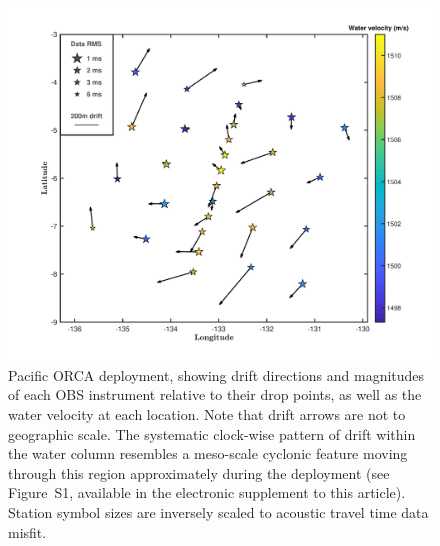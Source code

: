 \documentclass[10pt,titlepage]{article}
\begin{document}
\newpage

\begin{figure}[h]
\includegraphics[trim=0cm 0cm 0cm 0cm,clip=true,width=\columnwidth]{Figure08.pdf}
\caption{Pacific ORCA deployment, showing drift directions and magnitudes of each OBS instrument relative to their drop points, as well as the water velocity at each location. Note that drift arrows are not to geographic scale. The systematic clock-wise pattern of drift within the water column resembles a meso-scale cyclonic feature moving through this region approximately during the deployment (see Figure~S1, available in the electronic supplement to this article). Station symbol sizes are inversely scaled to acoustic travel time data misfit.}
\label{fig:meso_eddy}
\end{figure}
\newpage
\end{document}
